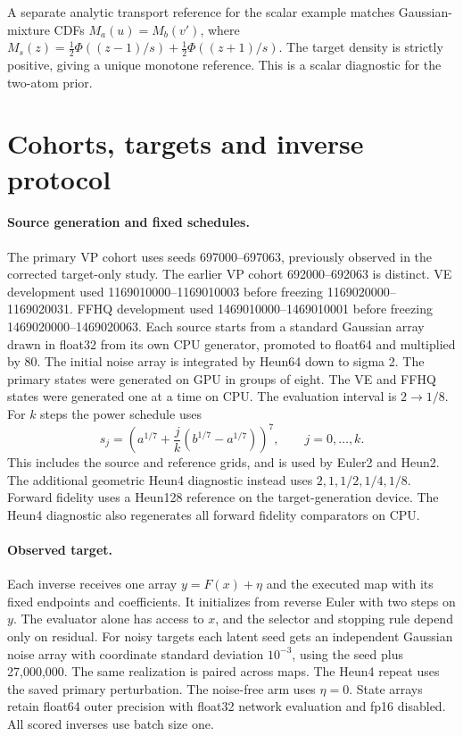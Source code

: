 \documentclass[10pt,twocolumn,letterpaper]{article}
\begin{document}
A separate analytic transport reference for the scalar example matches Gaussian-mixture CDFs $M_a(u)=M_b(v')$, where $M_s(z)=\tfrac12\Phi((z-1)/s)+\tfrac12\Phi((z+1)/s)$. The target density is strictly positive, giving a unique monotone reference. This is a scalar diagnostic for the two-atom prior.
\FloatBarrier

\section{Cohorts, targets and inverse protocol}
\label{sec:protocol}
\paragraph{Source generation and fixed schedules.}
The primary VP cohort uses seeds 697000--697063, previously observed in the corrected target-only study. The earlier VP cohort 692000--692063 is distinct. VE development used 1169010000--1169010003 before freezing 1169020000--1169020031. FFHQ development used 1469010000--1469010001 before freezing 1469020000--1469020063. Each source starts from a standard Gaussian array drawn in float32 from its own CPU generator, promoted to float64 and multiplied by 80. The initial noise array is integrated by Heun64 down to sigma 2. The primary states were generated on GPU in groups of eight. The VE and FFHQ states were generated one at a time on CPU. The evaluation interval is $2\to1/8$. For $k$ steps the power schedule uses
\[
 s_j=\left(a^{1/7}+\frac{j}{k}(b^{1/7}-a^{1/7})\right)^7,\qquad j=0,\ldots,k.
\]
This includes the source and reference grids, and is used by Euler2 and Heun2. The additional geometric Heun4 diagnostic instead uses $2,1,1/2,1/4,1/8$. Forward fidelity uses a Heun128 reference on the target-generation device. The Heun4 diagnostic also regenerates all forward fidelity comparators on CPU.

\paragraph{Observed target.}
Each inverse receives one array $y=F(x)+\eta$ and the executed map with its fixed endpoints and coefficients. It initializes from reverse Euler with two steps on $y$. The evaluator alone has access to $x$, and the selector and stopping rule depend only on residual. For noisy targets each latent seed gets an independent Gaussian noise array with coordinate standard deviation $10^{-3}$, using the seed plus 27,000,000. The same realization is paired across maps. The Heun4 repeat uses the saved primary perturbation. The noise-free arm uses $\eta=0$. State arrays retain float64 outer precision with float32 network evaluation and fp16 disabled. All scored inverses use batch size one.
\end{document}

